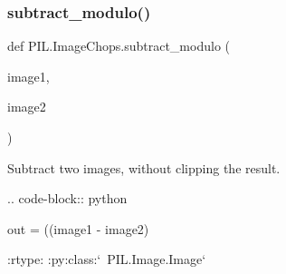 \subsubsection{\texorpdfstring{subtract\+\_\+modulo()}{subtract\_modulo()}}
{\footnotesize\ttfamily def P\+I\+L.\+Image\+Chops.\+subtract\+\_\+modulo (\begin{DoxyParamCaption}\item[{}]{image1,  }\item[{}]{image2 }\end{DoxyParamCaption})}

\begin{DoxyVerb}Subtract two images, without clipping the result.

.. code-block:: python

    out = ((image1 - image2) %

:rtype: :py:class:`~PIL.Image.Image`
\end{DoxyVerb}
 